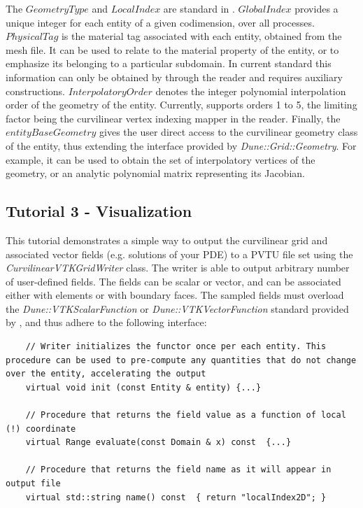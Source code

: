 \noindent
The $GeometryType$ and $LocalIndex$ are standard in \dune{}. $GlobalIndex$ provides a unique integer for each entity of a given codimension, over all processes. $PhysicalTag$ is the material tag associated with each entity, obtained from the mesh file. It can be used to relate to the material property of the entity, or to emphasize its belonging to a particular subdomain. In current \dunegrid{} standard this information can only be obtained by through the reader and requires auxiliary constructions. $InterpolatoryOrder$ denotes the integer polynomial interpolation order of the geometry of the entity. Currently, \curvgrid{} supports orders 1 to 5, the limiting factor being the curvilinear vertex indexing mapper in the reader. Finally, the $entityBaseGeometry$ gives the user direct access to the curvilinear geometry class of the entity, thus extending the interface provided by \textit{Dune::Grid::Geometry}. For example, it can be used to obtain the set of interpolatory vertices of the geometry, or an analytic polynomial matrix representing its Jacobian. \\






\subsection{Tutorial 3 - Visualization}
\label{usage-howto-tutorial-visualisation}

This tutorial demonstrates a simple way to output the curvilinear grid and associated vector fields (e.g. solutions of your PDE) to a PVTU file set using the \textit{CurvilinearVTKGridWriter} class. The writer is able to output arbitrary number of user-defined fields. The fields can be scalar or vector, and can be associated either with elements or with boundary faces. The sampled fields must overload the \textit{Dune::VTKScalarFunction} or \textit{Dune::VTKVectorFunction} standard provided by \curvgrid{}, and thus adhere to the following interface:

\begin{mybox}
\begin{lstlisting}
    // Writer initializes the functor once per each entity. This procedure can be used to pre-compute any quantities that do not change over the entity, accelerating the output
    virtual void init (const Entity & entity) {...}

    // Procedure that returns the field value as a function of local (!) coordinate
    virtual Range evaluate(const Domain & x) const  {...}

    // Procedure that returns the field name as it will appear in output file
    virtual std::string name() const  { return "localIndex2D"; }
\end{lstlisting}
\end{mybox}


